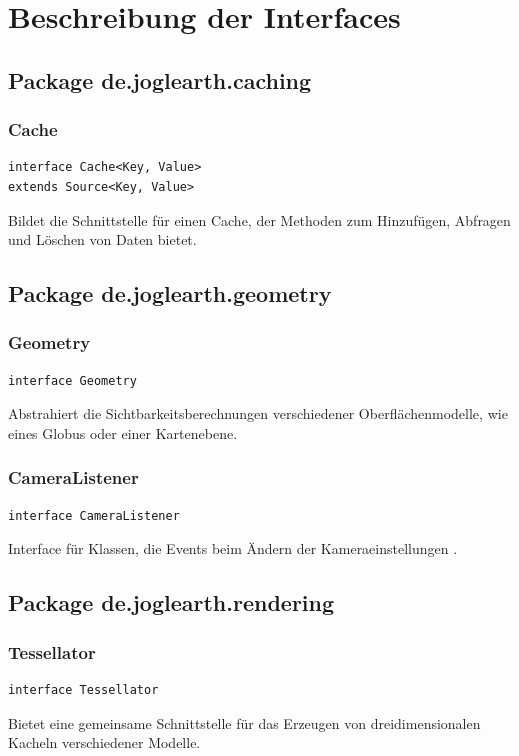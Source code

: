 \documentclass[10pt]{scrreprt}
\begin{document}
\chapter{Beschreibung der Interfaces}

\section{Package de.joglearth.caching}
\subsection*{Cache}
\begin{lstlisting}
interface Cache<Key, Value>
extends Source<Key, Value>
\end{lstlisting}
Bildet die Schnittstelle für einen Cache, der Methoden zum Hinzufügen, Abfragen und Löschen von Daten bietet.\\


\vspace{5mm}
\section{Package de.joglearth.geometry}
\subsection*{Geometry}
\begin{lstlisting}
interface Geometry
\end{lstlisting}
Abstrahiert die Sichtbarkeitsberechnungen verschiedener Oberflächenmodelle, wie eines Globus oder einer Kartenebene.\\

\vspace{5mm}
\subsection*{CameraListener}
\begin{lstlisting}
interface CameraListener
\end{lstlisting}
Interface für Klassen, die Events beim Ändern der Kameraeinstellungen .\\


\vspace{5mm}
\section{Package de.joglearth.rendering}
\subsection*{Tessellator}
\begin{lstlisting}
interface Tessellator
\end{lstlisting}
Bietet eine gemeinsame Schnittstelle für das Erzeugen von dreidimensionalen Kacheln verschiedener Modelle.\\
\end{document}
